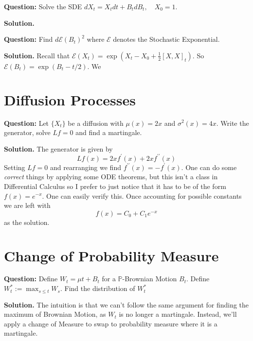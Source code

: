 \documentclass{article}
\begin{document}
\begin{tcolorbox}[colframe=black,colback=gray!5,boxrule=0.5pt]
\textbf{Question:} Solve the SDE $dX_t = X_t dt + B_tdB_t, \quad X_0=1$.
\end{tcolorbox}
\textbf{Solution.} 


\begin{tcolorbox}[colframe=black,colback=gray!5,boxrule=0.5pt]
\textbf{Question:} Find $d\mathcal{E}(B_t)^2$ where $\mathcal{E}$ denotes the Stochastic Exponential.
\end{tcolorbox}
\textbf{Solution.} Recall that $\mathcal{E}(X_t) = \exp(X_t - X_0 + \frac{1}{2}[X,X]_t)$. So $\mathcal{E}(B_t) = \exp(B_t - t/2).$ We 

\newpage
\section{Diffusion Processes}

\begin{tcolorbox}[colframe=black,colback=gray!5,boxrule=0.5pt]
\textbf{Question:} Let $\{X_t\}$ be a diffusion with $\mu(x) = 2x$ and $\sigma^2(x) = 4x$. Write the generator, solve $Lf=0$ and find a martingale.  
\end{tcolorbox}
\textbf{Solution.} The generator is given by
$$Lf(x) = 2x f^\prime(x) + 2xf^{\prime\prime}(x)$$
Setting $Lf=0$ and rearranging we find $f^{\prime \prime}(x) = -f^\prime(x)$. One can do some \textit{correct} things by applying some ODE theorems, but this isn't a class in Differential Calculus so I prefer to just notice that it has to be of the form $f(x) = e^{-x}$. One can easily verify this. Once accounting for possible constants we are left with 
$$f(x) = C_0 + C_1e^{-x}$$
as the solution. 


\newpage
\section{Change of Probability Measure}

\begin{tcolorbox}[colframe=black,colback=gray!5,boxrule=0.5pt]
\textbf{Question:} Define $W_t = \mu t + B_t$ for a $\mathbb{P}$-Brownian Motion $B_t$. Define $W_t^*:=\max_{s\leq t} W_s$. Find the distribution of $W_t^*$
\end{tcolorbox}
\textbf{Solution.} The intuition is that we can't follow the same argument for finding the maximum of Brownian Motion, as $W_t$ is no longer a martingale. Instead, we'll apply a change of Measure to swap to probability measure where it is a martingale. 
\end{document}

